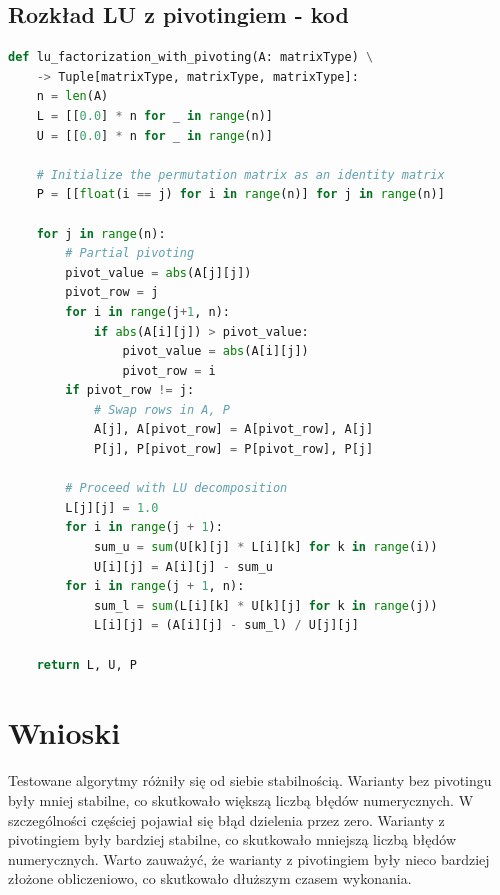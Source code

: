 \documentclass[a4paper]{article}
\begin{document}
\subsection{Rozkład LU z pivotingiem - kod}
\begin{lstlisting}[language=python]
def lu_factorization_with_pivoting(A: matrixType) \
    -> Tuple[matrixType, matrixType, matrixType]:
    n = len(A)
    L = [[0.0] * n for _ in range(n)]
    U = [[0.0] * n for _ in range(n)]

    # Initialize the permutation matrix as an identity matrix
    P = [[float(i == j) for i in range(n)] for j in range(n)]

    for j in range(n):
        # Partial pivoting
        pivot_value = abs(A[j][j])
        pivot_row = j
        for i in range(j+1, n):
            if abs(A[i][j]) > pivot_value:
                pivot_value = abs(A[i][j])
                pivot_row = i
        if pivot_row != j:
            # Swap rows in A, P
            A[j], A[pivot_row] = A[pivot_row], A[j]
            P[j], P[pivot_row] = P[pivot_row], P[j]

        # Proceed with LU decomposition
        L[j][j] = 1.0
        for i in range(j + 1):
            sum_u = sum(U[k][j] * L[i][k] for k in range(i))
            U[i][j] = A[i][j] - sum_u
        for i in range(j + 1, n):
            sum_l = sum(L[i][k] * U[k][j] for k in range(j))
            L[i][j] = (A[i][j] - sum_l) / U[j][j]

    return L, U, P

\end{lstlisting}

\section{Wnioski}

Testowane algorytmy różniły się od siebie stabilnością. Warianty bez pivotingu były mniej stabilne, co skutkowało większą liczbą błędów numerycznych.
 W szczególności częściej pojawiał się błąd dzielenia przez zero. Warianty z pivotingiem były bardziej stabilne, co skutkowało mniejszą liczbą błędów numerycznych.
Warto zauważyć, że warianty z pivotingiem były nieco bardziej złożone obliczeniowo, co skutkowało dłuższym czasem wykonania.
\end{document}
